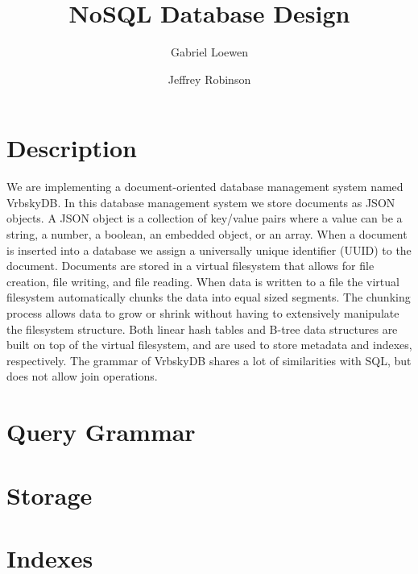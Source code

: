 \documentclass{article}
\begin{document}
\title{NoSQL Database Design}
\author{Gabriel Loewen \and Jeffrey Robinson}

\maketitle

\section{Description}
We are implementing a document-oriented database management system named VrbskyDB.  In this database management system we store documents as JSON objects.  A JSON object is a collection of key/value pairs where a value can be a string, a number, a boolean, an embedded object, or an array.  When a document is inserted into a database we assign a universally unique identifier (UUID) to the document.  Documents are stored in a virtual filesystem that allows for file creation, file writing, and file reading.  When data is written to a file the virtual filesystem automatically chunks the data into equal sized segments.  The chunking process allows data to grow or shrink without having to extensively manipulate the filesystem structure.  Both linear hash tables and B-tree data structures are built on top of the virtual filesystem, and are used to store metadata and indexes, respectively.  The grammar of VrbskyDB shares a lot of similarities with SQL, but does not allow join operations.

\section{Query Grammar}

\section{Storage}

\section{Indexes}
\end{document}
